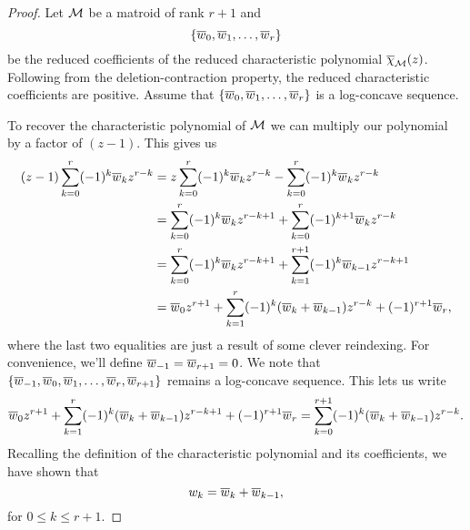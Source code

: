 \documentclass[12pt,oneside]{../../sfsuthesis}
\begin{document}
\begin{proof}

    Let \( \mathcal{M} \) be a matroid of rank \( r + 1 \) and
    \[
        \{\overline{w}_0, \overline{w}_1, \dots, \overline{w}_r \}
    \]
    be the reduced coefficients of the reduced characteristic polynomial \( \overline{\chi}_{\mathcal{M}}(z) \).
    Following from the deletion-contraction property, the reduced characteristic coefficients are positive.
    Assume that \( \{\overline{w}_0, \overline{w}_1, \dots, \overline{w}_r \} \) is a log-concave sequence.

    To recover the characteristic polynomial of \( \mathcal{M} \) we can multiply our polynomial by a factor of \( (z-1) \).
    This gives us
    \begin{align*}
        (z - 1)\sum_{k=0}^r(-1)^k \overline{w}_k z^{r-k} & = z\sum_{k=0}^r(-1)^k \overline{w}_k z^{r-k} - \sum_{k=0}^r(-1)^k \overline{w}_k z^{r-k}              \\
                                                & = \sum_{k=0}^r(-1)^k \overline{w}_k z^{r-k+1} + \sum_{k=0}^r(-1)^{k+1} \overline{w}_k z^{r-k}         \\
                                                & = \sum_{k=0}^r(-1)^k \overline{w}_k z^{r-k+1} + \sum_{k=1}^{r+1}(-1)^{k} \overline{w}_{k-1} z^{r-k+1} \\
                                                & = \overline{w}_0 z^{r+1} + \sum_{k=1}^r (-1)^k (\overline{w}_k + \overline{w}_{k-1})z^{r-k} + (-1)^{r+1}\overline{w}_r,
    \end{align*}
    where the last two equalities are just a result of some clever reindexing.
    For convenience, we'll define \( \overline{w}_{-1} = \overline{w}_{r+1} = 0 \).
    We note that \( \{ \overline{w}_{-1}, \overline{w}_0, \overline{w}_1, \dots, \overline{w}_r, \overline{w}_{r+1} \} \) remains a log-concave sequence.
    This lets us write
    \[
        \overline{w}_0 z^{r+1} + \sum_{k=1}^r (-1)^k (\overline{w}_k + \overline{w}_{k-1})z^{r-k+1} + (-1)^{r+1}\overline{w}_r = \sum_{k=0}^{r+1}(-1)^k(\overline{w}_k + \overline{w}_{k-1})z^{r-k}.
    \]
    Recalling the definition of the characteristic polynomial and its coefficients, we have shown that
    \[
        w_k = \overline{w}_k + \overline{w}_{k-1},
    \]
    for \( 0 \leq k \leq r+1 \).


\end{proof}
\end{document}
